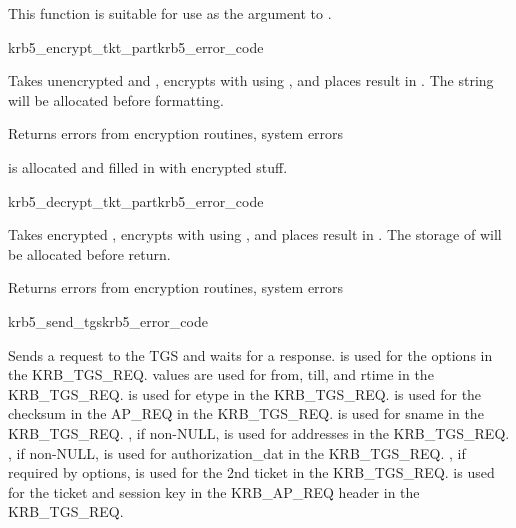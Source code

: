 This function is suitable for use as the 
argument to .

\begin{funcdecl}{krb5_encrypt_tkt_part}{krb5_error_code}{ \funcin}
\funcinout
{}
\end{funcdecl}

Takes unencrypted  and
, encrypts with
using , and places result in
.
The string  will be allocated
before formatting.

Returns errors from encryption routines, system errors

 is allocated and filled in with
encrypted stuff.

\begin{funcdecl}{krb5_decrypt_tkt_part}{krb5_error_code}{\funcin}
\funcinout
{}
\end{funcdecl}

Takes encrypted , encrypts with
using , and places result in
.  The storage of
 will be allocated before return.

Returns errors from encryption routines, system errors

\begin{funcdecl}{krb5_send_tgs}{krb5_error_code}{\funcin}
\funcinout
{}
\funcout
{}
\end{funcdecl}

Sends a request to the TGS and waits for a response.
 is used for the options in the KRB_TGS_REQ.
 values are used for from, till, and rtime in the
KRB_TGS_REQ.
 is used for etype in the KRB_TGS_REQ.
 is used for the checksum in the AP_REQ in the KRB_TGS_REQ.
 is used for sname in the KRB_TGS_REQ.
, if non-NULL, is used for addresses in the KRB_TGS_REQ.
, if non-NULL, is used for authorization_dat in the KRB_TGS_REQ.
, if required by options, is used for the 2nd
ticket in the KRB_TGS_REQ.
 is used for the ticket and session key in the KRB_AP_REQ header in the KRB_TGS_REQ.

